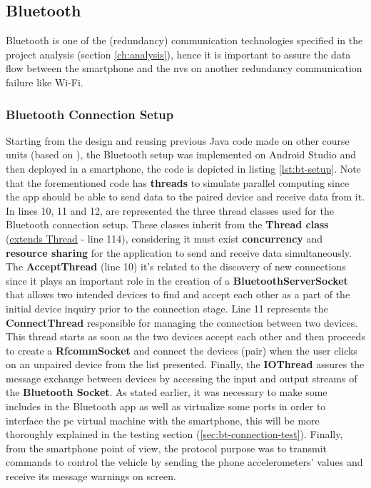 \subsection{Bluetooth}%
\label{sec:bluetooth-implem}
%
Bluetooth is one of the (redundancy) communication technologies specified in the project analysis (section \ref{ch:analysis}), hence it is important to assure the data flow between the smartphone and the \gls{nvs} on another redundancy communication failure like Wi-Fi. 
%
\subsubsection{Bluetooth Connection Setup}
\label{sec:bluetooth-connection-setup}
Starting from the design and reusing previous Java code made on other course units (based on \cite{btchatsrc}), the Bluetooth setup was implemented on Android Studio and then deployed in a smartphone, the code is depicted in listing \ref{lst:bt-setup}.
%
Note that the forementioned code has \textbf{threads} to simulate parallel computing since the app should be able to send data to the paired device and receive data from it.
%
In lines 10, 11 and 12, are represented the three thread classes used for the Bluetooth connection setup. These classes inherit from the \textbf{Thread class} (\underline{extends Thread} - line 114), considering it must exist \textbf{concurrency} and \textbf{resource sharing} for the application to send and receive data simultaneously. 
%
The \textbf{AcceptThread} (line 10) it's related to the discovery of new connections since it plays an important role in the creation of a \textbf{BluetoothServerSocket} that allows two intended devices to find and accept each other as a part of the initial device inquiry prior to the connection stage. Line 11 represents the \textbf{ConnectThread} responsible for managing the connection between two devices. This thread starts as soon as the two devices accept each other and then proceeds to create a \textbf{RfcommSocket} and connect the devices (pair) when the user clicks on an unpaired device from the list presented. Finally, the \textbf{IOThread} assures the message exchange between devices by accessing the input and output streams of the \textbf{Bluetooth Socket}.
%
As stated earlier, it was necessary to make some includes in the Bluetooth app as well as virtualize some ports in order to interface the \gls{pc} virtual machine with the smartphone, this will be more thoroughly explained in the testing section (\ref{sec:bt-connection-test}).
%
Finally, from the smartphone point of view, the protocol purpose was to transmit commands to control the vehicle by sending the phone accelerometers' values and receive its message warnings on screen.\\
%

%


